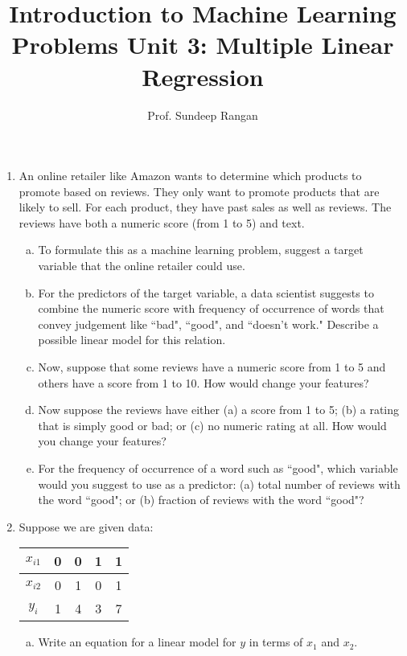 \documentclass[11pt]{article}
\begin{document}
\title{Introduction to Machine Learning\\
Problems Unit 3:  Multiple Linear Regression}
\author{Prof. Sundeep Rangan}
\date{}

\maketitle

\begin{enumerate}

\item An online retailer like Amazon wants to determine which products
 to promote based on reviews.  They only want to promote products that are likely
 to sell. For each product, they have past sales as well as
 reviews.  The reviews have both a numeric score (from 1 to 5) and text.
\begin{enumerate}[(a)]
\item To formulate this as a machine learning problem, suggest
a target variable that the online retailer could use.

\item For the predictors of the target variable, a data scientist
suggests to combine the numeric score with frequency of occurrence
of words that convey judgement like ``bad", ``good", and ``doesn't work."
Describe a possible linear model for this relation.

\item Now, suppose that
some reviews have a numeric score from 1 to 5 and others have a score
from 1 to 10.  How would change your features?

\item Now suppose the reviews have either (a) a score from 1 to 5;
(b) a rating that is simply good or bad; or (c) no numeric rating at all.
How would you change your features?

\item For the frequency of occurrence of a word such as ``good",
which variable would you suggest to use as a predictor:
(a) total number of reviews with the word ``good";
or (b) fraction of reviews with the word ``good"?
\end{enumerate}

\item Suppose we are given data:
\begin{center}
\begin{tabular}[h]{|c|c|c|c|c|} \hline
$x_{i1}$ & 0 & 0 & 1 & 1 \\ \hline
$x_{i2}$ & 0 & 1 & 0 & 1 \\ \hline
$y_i$ &    1 & 4 & 3 & 7  \\ \hline
\end{tabular}
\begin{enumerate}[(a)]
\item Write an equation for a linear model for $y$ in terms of $x_1$ and $x_2$.


\end{enumerate}
\end{center}
\end{enumerate}
\end{document}
